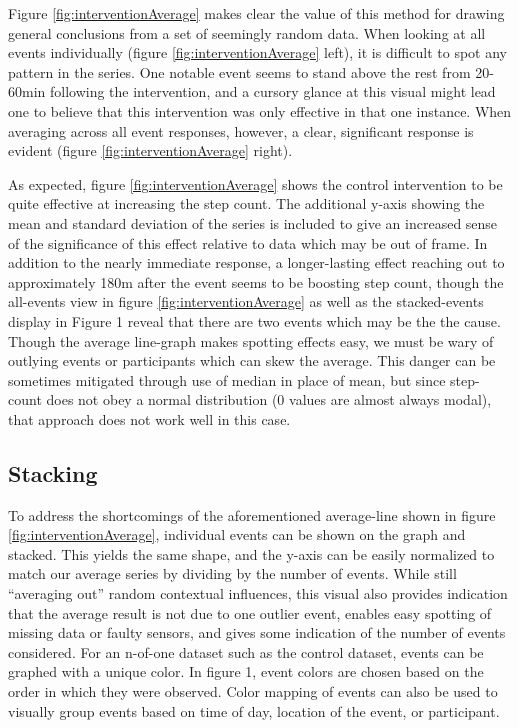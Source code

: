 \documentclass[review,journal]{vgtc}         %
\begin{document}
Figure \ref{fig:interventionAverage} makes clear the value of this method for drawing general conclusions from a set of seemingly random data.
When looking at all events individually (figure \ref{fig:interventionAverage} left), it is difficult to spot any pattern in the series.
One notable event seems to stand above the rest from 20-60min following the intervention, and a cursory glance at this visual might lead one to believe that this intervention was only effective in that one instance.
When averaging across all event responses, however, a clear, significant response is evident (figure \ref{fig:interventionAverage} right).

As expected, figure \ref{fig:interventionAverage} shows the control intervention to be quite effective at increasing the step count.
The additional y-axis showing the mean and standard deviation of the series is included to give an increased sense of the significance of this effect relative to data which may be out of frame.
In addition to the nearly immediate response, a longer-lasting effect reaching out to approximately 180m after the event seems to be boosting step count, though the all-events view in figure \ref{fig:interventionAverage} as well as the stacked-events display in Figure 1 reveal that there are two events which may be the the cause.
Though the average line-graph makes spotting effects easy, we must be wary of outlying events or participants which can skew the average.
This danger can be sometimes mitigated through use of median in place of mean, but since step-count does not obey a normal distribution (0 values are almost always modal), that approach does not work well in this case.

\subsection{Stacking}
To address the shortcomings of the aforementioned average-line shown in figure \ref{fig:interventionAverage}, individual events can be shown on the graph and stacked.
This yields the same shape, and the y-axis can be easily normalized to match our average series by dividing by the number of events.
While still “averaging out” random contextual influences, this visual also provides indication that the average result is not due to one outlier event, enables easy spotting of missing data or faulty sensors, and gives some indication of the number of events considered.
For an n-of-one dataset such as the control dataset, events can be graphed with a unique color.
In figure 1, event colors are chosen based on the order in which they were observed.
Color mapping of events can also be used to visually group events based on time of day, location of the event, or participant.
\end{document}
